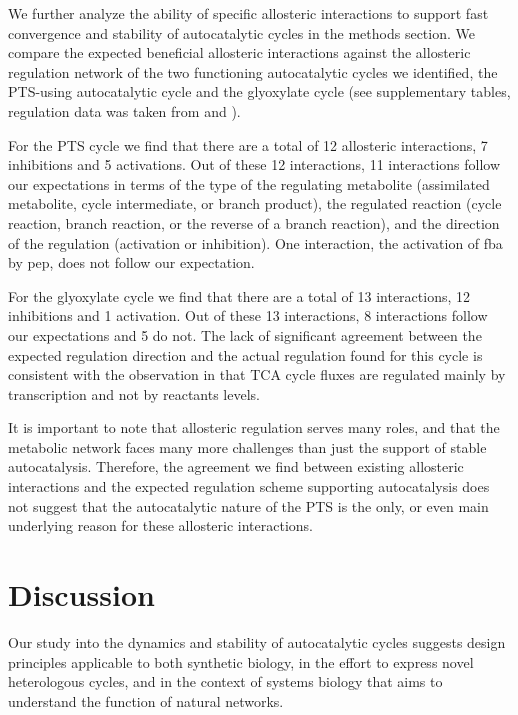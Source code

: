     We further analyze the ability of specific allosteric interactions to support fast convergence and stability of autocatalytic cycles in the methods section.
    We compare the expected beneficial allosteric interactions against the allosteric regulation network of the two functioning autocatalytic cycles we identified, the PTS-using autocatalytic cycle and the glyoxylate cycle (see supplementary tables, regulation data was taken from \cite{Keseler2013-xn} and \cite{Schomburg2004-st}).

    For the PTS cycle we find that there are a total of 12 allosteric interactions, 7 inhibitions and 5 activations.
    Out of these 12 interactions, 11 interactions follow our expectations in terms of the type of the regulating metabolite (assimilated metabolite, cycle intermediate, or branch product), the regulated reaction (cycle reaction, branch reaction, or the reverse of a branch reaction), and the direction of the regulation (activation or inhibition).
    One interaction, the activation of fba by pep, does not follow our expectation.

    For the glyoxylate cycle we find that there are a total of 13 interactions, 12 inhibitions and 1 activation.
    Out of these 13 interactions, 8 interactions follow our expectations and 5 do not.
    The lack of significant agreement between the expected regulation direction and the actual regulation found for this cycle is consistent with the observation in \cite{Gerosa2015-oq} that TCA cycle fluxes are regulated mainly by transcription and not by reactants levels.

    It is important to note that allosteric regulation serves many roles, and that the metabolic network faces many more challenges than just the support of stable autocatalysis.
    Therefore, the agreement we find between existing allosteric interactions and the expected regulation scheme supporting autocatalysis does not suggest that the autocatalytic nature of the PTS is the only, or even main underlying reason for these allosteric interactions.
\section{Discussion}
Our study into the dynamics and stability of autocatalytic cycles suggests design principles applicable to both synthetic biology, in the effort to express novel heterologous cycles, and in the context of systems biology that aims to understand the function of natural networks.

